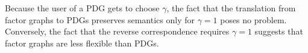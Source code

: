 \documentclass[letterpaper]{article} %
\theoremstyle{plain}
\theoremstyle{definition}
\theoremstyle{remark}
\begin{document}
Because the user of a PDG gets to choose $\gamma$, the fact that the 
translation from factor graphs to PDGs preserves semantics only for $\gamma=1$
poses no problem.
Conversely, the fact that the reverse correspondence requires
$\gamma=1$ suggests 
that factor graphs are less flexible than PDGs.
\end{document}
